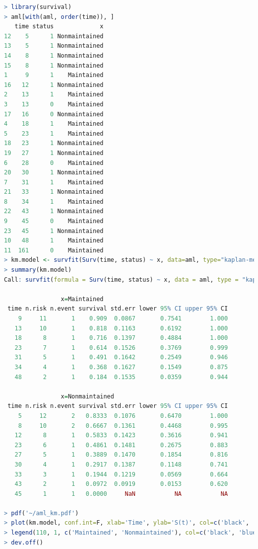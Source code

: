 \begin{lstlisting}[language=R]
> library(survival)
> aml[with(aml, order(time)), ]
   time status             x
12    5      1 Nonmaintained
13    5      1 Nonmaintained
14    8      1 Nonmaintained
15    8      1 Nonmaintained
1     9      1    Maintained
16   12      1 Nonmaintained
2    13      1    Maintained
3    13      0    Maintained
17   16      0 Nonmaintained
4    18      1    Maintained
5    23      1    Maintained
18   23      1 Nonmaintained
19   27      1 Nonmaintained
6    28      0    Maintained
20   30      1 Nonmaintained
7    31      1    Maintained
21   33      1 Nonmaintained
8    34      1    Maintained
22   43      1 Nonmaintained
9    45      0    Maintained
23   45      1 Nonmaintained
10   48      1    Maintained
11  161      0    Maintained
> km.model <- survfit(Surv(time, status) ~ x, data=aml, type="kaplan-meier")
> summary(km.model)
Call: survfit(formula = Surv(time, status) ~ x, data = aml, type = "kaplan-meier")

                x=Maintained
 time n.risk n.event survival std.err lower 95% CI upper 95% CI
    9     11       1    0.909  0.0867       0.7541        1.000
   13     10       1    0.818  0.1163       0.6192        1.000
   18      8       1    0.716  0.1397       0.4884        1.000
   23      7       1    0.614  0.1526       0.3769        0.999
   31      5       1    0.491  0.1642       0.2549        0.946
   34      4       1    0.368  0.1627       0.1549        0.875
   48      2       1    0.184  0.1535       0.0359        0.944

                x=Nonmaintained
 time n.risk n.event survival std.err lower 95% CI upper 95% CI
    5     12       2   0.8333  0.1076       0.6470        1.000
    8     10       2   0.6667  0.1361       0.4468        0.995
   12      8       1   0.5833  0.1423       0.3616        0.941
   23      6       1   0.4861  0.1481       0.2675        0.883
   27      5       1   0.3889  0.1470       0.1854        0.816
   30      4       1   0.2917  0.1387       0.1148        0.741
   33      3       1   0.1944  0.1219       0.0569        0.664
   43      2       1   0.0972  0.0919       0.0153        0.620
   45      1       1   0.0000     NaN           NA           NA

> pdf('~/aml_km.pdf')
> plot(km.model, conf.int=F, xlab='Time', ylab='S(t)', col=c('black', 'blue'), las=1, mark.time=T, lty=1:2, las=1)
> legend(110, 1, c('Maintained', 'Nonmaintained'), col=c('black', 'blue'), lty=1:2, bty='n')
> dev.off()
\end{lstlisting}

